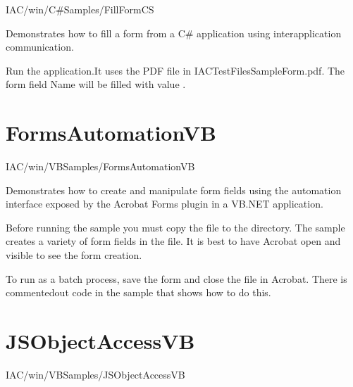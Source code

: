 \documentclass[letterpaper,12pt,english,openany,oneside]{sphinxmanual}
\begin{document}
IAC/win/C\#Samples/FillFormCS

\label{\detokenize{Samples_WindowsIAC:description-15}}

Demonstrates how to fill a form from a C\# application using interapplication communication.

\label{\detokenize{Samples_WindowsIAC:usage-11}}

Run the application.It uses the PDF file in IACTestFilesSampleForm.pdf. The form field Name will be filled with value  .


\section{FormsAutomationVB}
\label{\detokenize{Samples_WindowsIAC:formsautomationvb}}\label{\detokenize{Samples_WindowsIAC:location-16}}

IAC/win/VBSamples/FormsAutomationVB

\label{\detokenize{Samples_WindowsIAC:description-16}}

Demonstrates how to create and manipulate form fields using the automation interface exposed by the Acrobat Forms plugin in a VB.NET application.

\label{\detokenize{Samples_WindowsIAC:usage-12}}

Before running the sample you must copy the  file to the  directory. The sample creates a variety of form fields in the file. It is best to have Acrobat open and visible to see the form creation.

To run as a batch process, save the form and close the file in Acrobat. There is commented\sphinxhyphen{}out code in the sample that shows how to do this.


\section{JSObjectAccessVB}
\label{\detokenize{Samples_WindowsIAC:jsobjectaccessvb}}\label{\detokenize{Samples_WindowsIAC:location-17}}

IAC/win/VBSamples/JSObjectAccessVB

\label{\detokenize{Samples_WindowsIAC:description-17}}
\end{document}
